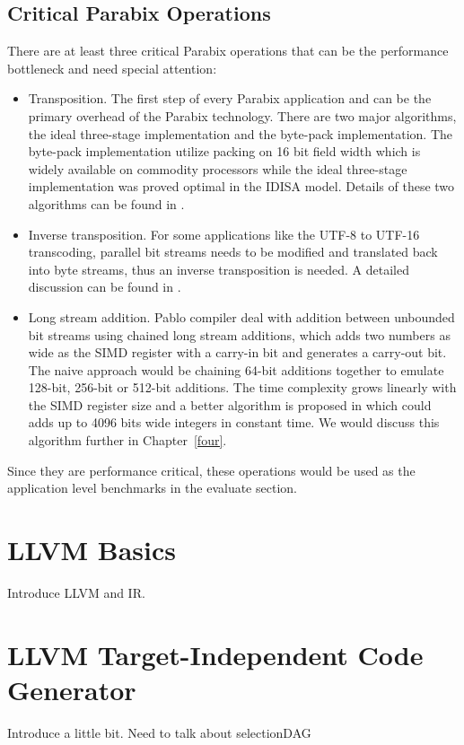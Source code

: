 \subsection{Critical Parabix Operations}
There are at least three critical Parabix operations that can be the performance bottleneck and need special attention:
\begin{itemize}
    \item Transposition. The first step of every Parabix application and can be the primary overhead of the Parabix technology. There are two major algorithms, the ideal three-stage implementation and the byte-pack implementation. The byte-pack implementation utilize packing on 16 bit field width which is widely available on commodity processors while the ideal three-stage implementation was proved optimal in the IDISA model. Details of these two algorithms can be found in \cite{inductive_doubling_principle}.
    \item Inverse transposition. For some applications like the UTF-8 to UTF-16 transcoding, parallel bit streams needs to be modified and translated back into byte streams, thus an inverse transposition is needed. A detailed discussion can be found in \cite{rob_u8u16}.
    \item Long stream addition. Pablo compiler deal with addition between unbounded bit streams using chained long stream additions, which adds two numbers as wide as the SIMD register with a carry-in bit and generates a carry-out bit. The naive approach would be chaining 64-bit additions together to emulate 128-bit, 256-bit or 512-bit additions. The time complexity grows linearly with the SIMD register size and a better algorithm is proposed in \cite{rob_regex} which could adds up to 4096 bits wide integers in constant time. We would discuss this algorithm further in Chapter~\ref{four}.
\end{itemize}

Since they are performance critical, these operations would be used as the application level benchmarks in the evaluate section.

\section{LLVM Basics}
Introduce LLVM and IR.

\section{LLVM Target-Independent Code Generator}
Introduce a little bit.
Need to talk about selectionDAG

